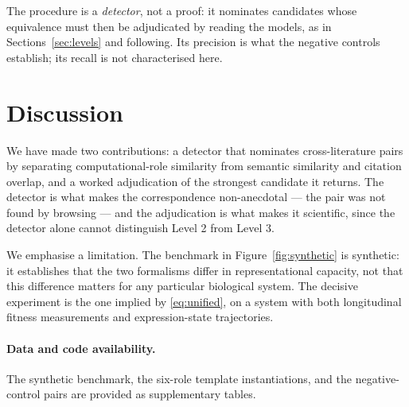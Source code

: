 \documentclass[11pt]{article}
\begin{document}
The procedure is a \emph{detector}, not a proof: it nominates candidates whose equivalence must then be adjudicated
by reading the models, as in Sections~\ref{sec:levels} and following. Its precision is what the negative controls
establish; its recall is not characterised here.

\section{Discussion}
We have made two contributions: a detector that nominates cross-literature pairs by separating computational-role
similarity from semantic similarity and citation overlap, and a worked adjudication of the strongest candidate it
returns. The detector is what makes the correspondence non-anecdotal --- the pair was not found by browsing --- and
the adjudication is what makes it scientific, since the detector alone cannot distinguish Level 2 from Level 3.

We emphasise a limitation. The benchmark in Figure~\ref{fig:synthetic} is synthetic: it establishes that the two
formalisms differ in representational capacity, not that this difference matters for any particular biological
system. The decisive experiment is the one implied by \eqref{eq:unified}, on a system with both longitudinal
fitness measurements and expression-state trajectories.

\paragraph{Data and code availability.} The synthetic benchmark, the six-role template instantiations, and the
negative-control pairs are provided as supplementary tables.


\end{document}
